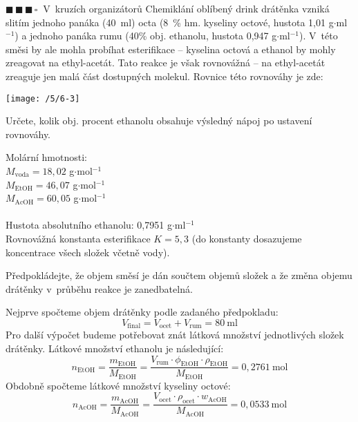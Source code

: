 \documentclass{book}
\newcommand{\tri}{$\blacksquare \, \blacksquare \, \blacksquare \, \square \; \; $}
\renewenvironment{quotation}{\par}{\par} %
\begin{document}
\newpage %
\begin{quotation}
\tri V~kruzích organizátorů Chemiklání oblíbený drink drátěnka vzniká slitím
jednoho panáka (40~ml) octa (8~\% hm. kyseliny octové, hustota 1,01 g$\cdot$ml$^{-1}$)
a jednoho panáka rumu (40\% obj. ethanolu, hustota 0,947 g$\cdot$ml$^{-1}$). V~této směsi by ale mohla probíhat esterifikace -- kyselina octová a ethanol by mohly zreagovat na ethyl-acetát. Tato reakce je však rovnovážná -- na ethyl-acetát zreaguje jen malá část dostupných molekul. Rovnice této rovnováhy je zde:

\begin{center}
\texttt{[image: /5/6-3]}    
\end{center}


Určete, kolik obj. procent ethanolu obsahuje výsledný nápoj po ustavení
rovnováhy.

Molární hmotnosti: \\
 $M_{\text{voda}}=18,02$ g$\cdot$mol$^{-1}$\\
 $M_{\text{EtOH}}=46,07$ g$\cdot$mol$^{-1}$\\
 $M_{\text{AcOH}}=60,05$ g$\cdot$mol$^{-1}$\\
 \\
 Hustota absolutního ethanolu: 0,7951 g$\cdot$ml$^{-1}$\\
 Rovnovážná konstanta esterifikace $K=5,3$ (do konstanty dosazujeme
koncentrace všech složek včetně vody).

Předpokládejte, že objem směsí je dán součtem objemů složek a že změna
objemu drátěnky v~průběhu reakce je zanedbatelná.
\end{quotation} \dotfill \par 
Nejprve spočteme objem drátěnky podle zadaného předpokladu: 
\[
V_{\text{final}}=V_{\text{ocet}}+V_{\text{rum}}=80\mathrm{~ml}
\]
Pro další výpočet budeme potřebovat znát látková množství jednotlivých
složek drátěnky. Látkové množství ethanolu je následující: 
\[
n_{\mathrm{EtOH}}=\frac{m_{\mathrm{EtOH}}}{M_{\mathrm{EtOH}}}=\frac{V_{\text{rum}}\cdot\phi_{\mathrm{EtOH}}\cdot\rho_{\mathrm{EtOH}}}{M_{\mathrm{EtOH}}}=0,2761\mathrm{~mol}
\]
Obdobně spočteme látkové množství kyseliny octové: 
\[
n_{\mathrm{AcOH}}=\frac{m_{\mathrm{AcOH}}}{M_{\mathrm{AcOH}}}=\frac{V_{\text{ocet}}\cdot\rho_{\mathrm{ocet}}\cdot w_{\mathrm{AcOH}}}{M_{\mathrm{AcOH}}}=0,0533\mathrm{~mol}
\]
\end{document}
